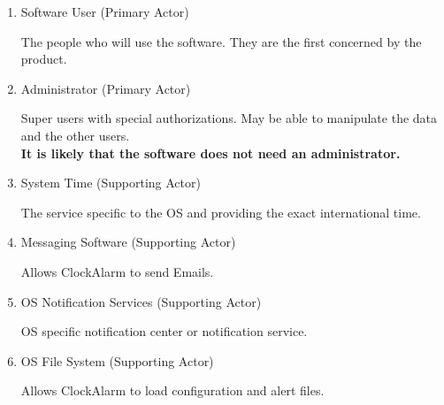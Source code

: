 \begin{enumerate}
	\item Software User (Primary Actor)
	\par The people who will use the software. They are the first concerned by the product.
	\item Administrator (Primary Actor)
	\par Super users with special authorizations. May be able to manipulate the data and the other users.
	\\ \textbf{It is likely that the software does not need an administrator.}
	\item System Time (Supporting Actor)
	\par The service specific to the OS and providing the exact international time.
	\item Messaging Software (Supporting Actor)
	\par Allows ClockAlarm to send Emails.
	\item OS Notification Services (Supporting Actor)
	\par OS specific notification center or notification service.
    \item OS File System (Supporting Actor)
    \par Allows ClockAlarm to load configuration and alert files.
\end{enumerate}
